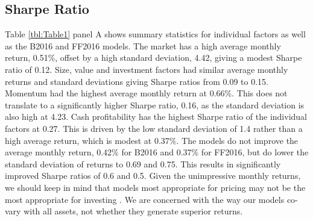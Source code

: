 
\subsection{Sharpe Ratio}

Table \ref{tbl:Table1} panel A shows summary statistics for individual factors as well as
the  B2016 and FF2016 models. The market has a high average monthly return, 0.51\%,
offset by a high standard deviation,  4.42, giving a modest Sharpe ratio of 0.12. Size,
value and investment factors had similar average monthly returns and standard deviations
giving Sharpe ratios from 0.09 to 0.15. Momentum had the highest average monthly return at
0.66\%. This does not translate to a significantly higher Sharpe ratio, 0.16, as the
standard  deviation is also high at 4.23. Cash profitability has the highest Sharpe ratio
of the individual factors at 0.27. This is driven by the low standard deviation of 1.4
rather than a high average return, which  is modest at 0.37\%. The models do not improve
the average monthly return, 0.42\% for B2016 and 0.37\% for  FF2016, but do lower the
standard deviation of returns to 0.69 and 0.75. This results in significantly improved
Sharpe ratios of 0.6 and 0.5. Given the unimpressive monthly returns, we should keep in
mind that models most  appropriate for pricing may not be the most appropriate for
investing  \parencite{pastor2000comparing}. We are concerned with the way our models co-
vary with all assets, not whether they  generate superior returns.

